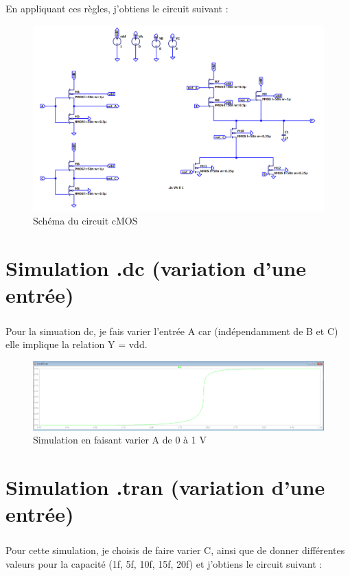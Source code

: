     \subparagraph{}En appliquant ces règles, j'obtiens le circuit suivant :
        \begin{figure}[H]
            \centering
            \includegraphics[scale=0.5]{../pictures/circuit.png}
            \caption{Schéma du circuit cMOS}
        \end{figure}
        
\section{Simulation .dc (variation d'une entrée)}

    \subparagraph{}Pour la simuation dc, je fais varier l'entrée A car (indépendamment de B et C) elle implique la relation Y = vdd.
    
        \begin{figure}[H]
            \centering
            \includegraphics[scale=0.35]{../pictures/dc.png}
            \caption{Simulation en faisant varier A de 0 à 1 V}
        \end{figure}
\section{Simulation .tran (variation d'une entrée)}

    \subparagraph{}Pour cette simulation, je choisis de faire varier C, ainsi que de donner différentes valeurs pour la capacité (1f, 5f, 10f, 15f, 20f) et j'obtiens le circuit suivant :
    
